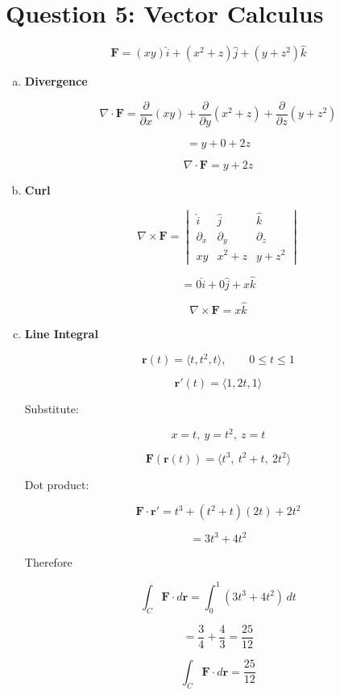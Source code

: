 \documentclass[12pt]{article}
\begin{document}
\newpage

\section*{Question 5: Vector Calculus}

\[
\mathbf{F}=(xy)\hat{i}+(x^2+z)\hat{j}+(y+z^2)\hat{k}
\]

\begin{enumerate}[a)]

\item \textbf{Divergence}

\[
\nabla\cdot\mathbf{F}
=
\frac{\partial}{\partial x}(xy)
+\frac{\partial}{\partial y}(x^2+z)
+\frac{\partial}{\partial z}(y+z^2)
\]

\[
= y+0+2z
\]

\[
\boxed{\nabla\cdot\mathbf{F}=y+2z}
\]

\item \textbf{Curl}

\[
\nabla\times\mathbf{F}
=
\begin{vmatrix}
\hat{i}&\hat{j}&\hat{k}\\
\partial_x&\partial_y&\partial_z\\
xy&x^2+z&y+z^2
\end{vmatrix}
\]

\[
=
0\hat{i}+0\hat{j}+x\hat{k}
\]

\[
\boxed{\nabla\times\mathbf{F}=x\hat{k}}
\]

\item \textbf{Line Integral}

\[
\mathbf r(t)=\langle t,t^2,t\rangle,\qquad 0\le t\le1
\]

\[
\mathbf r'(t)=\langle1,2t,1\rangle
\]

Substitute:

\[
x=t,\ y=t^2,\ z=t
\]

\[
\mathbf F(\mathbf r(t))
=
\langle t^3,\ t^2+t,\ 2t^2\rangle
\]

Dot product:

\[
\mathbf F\cdot\mathbf r'
=
t^3+(t^2+t)(2t)+2t^2
\]

\[
=3t^3+4t^2
\]

Therefore

\[
\int_C \mathbf F\cdot d\mathbf r
=
\int_0^1(3t^3+4t^2)\,dt
\]

\[
=
\frac34+\frac43
=
\frac{25}{12}
\]

\[
\boxed{\int_C \mathbf F\cdot d\mathbf r=\frac{25}{12}}
\]

\end{enumerate}
\end{document}
